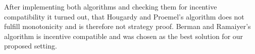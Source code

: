 After implementing both algorithms and checking them for incentive compatibility it turned out, that Hougardy and Proemel's algorithm does not fulfill monotonicity and is therefore not strategy proof. Berman and Ramaiyer's algorithm is incentive compatible and was chosen as the best solution for our proposed setting.